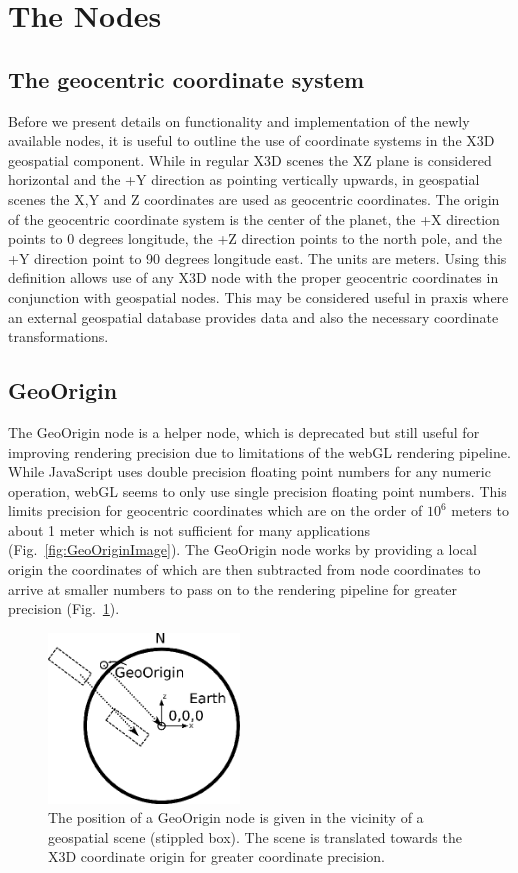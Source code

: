\documentclass{acmsiggraph}                     %
\begin{document}
\section{The Nodes}

\subsection{The geocentric coordinate system}

Before we present details on functionality and implementation of the newly available nodes, it is useful to outline the use of coordinate systems in the X3D geospatial component. While in regular X3D scenes the XZ plane is considered horizontal and the +Y direction as pointing vertically upwards, in geospatial scenes the X,Y and Z coordinates are used as geocentric coordinates. The origin of the geocentric coordinate system is the center of the planet, the +X direction points to 0 degrees longitude, the +Z direction points to the north pole, and the +Y direction point to 90 degrees longitude east. The units are meters. Using this definition allows use of any X3D node with the proper geocentric coordinates in conjunction with geospatial nodes. This may be considered useful in praxis where an external geospatial database provides data and also the necessary coordinate transformations.

\subsection{GeoOrigin}

The GeoOrigin node is a helper node, which is deprecated but still useful for improving rendering precision due to limitations of the webGL rendering pipeline. While JavaScript uses double precision floating point numbers for any numeric operation, webGL seems to only use single precision floating point numbers. This limits precision for geocentric coordinates which are on the order of $10^{6}$ meters to about 1 meter which is not sufficient for many applications (Fig.~\ref{fig:GeoOriginImage}). The GeoOrigin node works by providing a local origin the coordinates of which are then subtracted from node coordinates to arrive at smaller numbers to pass on to the rendering pipeline for greater precision (Fig.~\ref{fig:GeoOriginDiagram}).

\begin{figure}[htbp]
\centering
\includegraphics[width=2.0in]{GeoOriginDiagram.png}
\caption{The position of a GeoOrigin node is given in the vicinity of a geospatial scene (stippled box). The scene is translated towards the X3D coordinate origin for greater coordinate precision.}
\label{fig:GeoOriginDiagram}
\end{figure}
\end{document}
